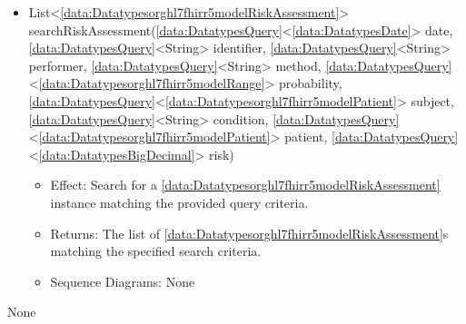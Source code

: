 \begin{description}
\begin{itemize}[noitemsep,nolistsep,leftmargin=-.25cm]
\begin{itemize}[noitemsep,nolistsep]
           \item Sequence Diagrams: None
        \end{itemize}
      \item \textsf{List\textless{}\ref{data:Datatypesorghl7fhirr5modelRiskAssessment}\textgreater{} searchRiskAssessment(\ref{data:DatatypesQuery}\textless{}\ref{data:DatatypesDate}\textgreater{} date, \ref{data:DatatypesQuery}\textless{}String\textgreater{} identifier, \ref{data:DatatypesQuery}\textless{}String\textgreater{} performer, \ref{data:DatatypesQuery}\textless{}String\textgreater{} method, \ref{data:DatatypesQuery}\textless{}\ref{data:Datatypesorghl7fhirr5modelRange}\textgreater{} probability, \ref{data:DatatypesQuery}\textless{}\ref{data:Datatypesorghl7fhirr5modelPatient}\textgreater{} subject, \ref{data:DatatypesQuery}\textless{}String\textgreater{} condition, \ref{data:DatatypesQuery}\textless{}\ref{data:Datatypesorghl7fhirr5modelPatient}\textgreater{} patient, \ref{data:DatatypesQuery}\textless{}\ref{data:DatatypesBigDecimal}\textgreater{} risk)}
        \begin{itemize}[noitemsep,nolistsep]
           \item Effect: Search for a \ref{data:Datatypesorghl7fhirr5modelRiskAssessment} instance matching the provided query criteria. 
           \item Returns: The list of \ref{data:Datatypesorghl7fhirr5modelRiskAssessment}s matching the specified search criteria.
           \item Sequence Diagrams: None
        \end{itemize}
    \end{itemize}
      \item[Diagrams:] None
    \end{description}

